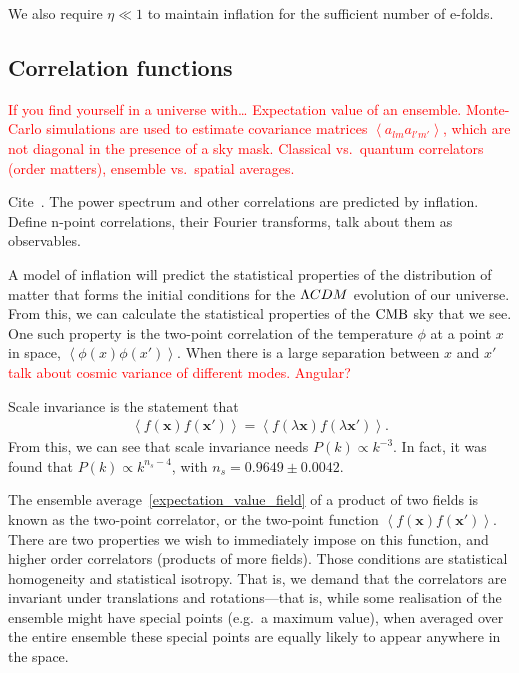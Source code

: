 We also require $\eta\ll1$ to maintain inflation for the sufficient number
of e-folds.


\subsection{Correlation functions}\label{corr_functions}
    \textcolor{red}{If you find yourself in a universe with\ldots
    Expectation value of an ensemble.
    Monte-Carlo simulations are used to estimate covariance matrices
    $\left<a_{lm}a_{l'm'}\right>$,
    which are not diagonal in the presence of a sky mask.
    Classical vs.\ quantum correlators (order matters), ensemble vs.\ spatial averages.}


    Cite~\cite{Planck_inflation_2015, Planck_inflation_2018}.
    The power spectrum and other correlations
    are predicted by inflation. 
    Define n-point correlations, their Fourier transforms, talk about them as observables.
    

    A model of inflation will predict the statistical properties of the distribution of matter
    that forms the initial conditions for the $\Lambda CDM$ evolution of our universe.
    From this, we can calculate the statistical properties of the $\text{CMB}$ sky that we see.
    One such property is the two-point correlation of the temperature $\phi$
    at a point $x$ in space, $\left<\phi(x)\phi(x')\right>$. When there is a large
    separation between $x$ and $x'$ \textcolor{red}{talk about cosmic variance
    of different modes. Angular?}

    Scale invariance is the statement that
    \begin{align}
        \left<f(\mathbf{x})f(\mathbf{x'})\right> = \left<f(\lambda\mathbf{x})f(\lambda\mathbf{x'})\right>.
    \end{align}
    From this, we can see that scale invariance needs $P(k)\propto k^{-3}$.
    In fact, it was found that $P(k)\propto k^{n_s-4}$, with $n_s=0.9649 \pm 0.0042$.


    The ensemble average~\eqref{expectation_value_field} of a product of two fields is known as the
    two-point correlator, or the two-point function $\left<f(\mathbf{x})f(\mathbf{x'})\right>$.
    There are two properties we wish to immediately impose on this function, and higher order correlators
    (products of more fields). Those conditions are statistical homogeneity and statistical isotropy.
    That is, we demand that the correlators are invariant under translations and rotations---that is,
    while some realisation of the ensemble might have special points (e.g.\ a maximum value),
    when averaged over the entire ensemble these special points are equally likely to appear anywhere in
    the space.


